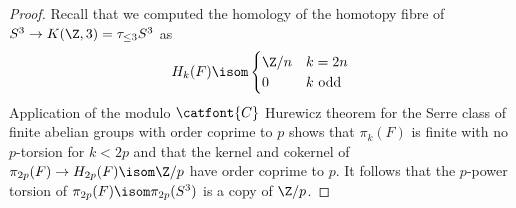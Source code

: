 \begin{proof}
	Recall that we computed the homology of the homotopy fibre of $S^3 \to K(\Z, 3) = \tau_{\leq 3} S^3$ as
	\begin{equation*}
		H_k(F) \isom \begin{cases}
			\Z / n 	& k = 2n \\
			0 		& k \text{ odd}
		\end{cases}
	\end{equation*}
	Application of the modulo $\catfont{C}$ Hurewicz theorem for the Serre class of finite abelian groups with order coprime to $p$ shows that $\pi_k(F)$ is finite with no $p$-torsion for $k < 2p$ and that the kernel and cokernel of $\pi_{2p}(F) \to H_{2p}(F) \isom \Zn{p}$ have order coprime to $p$.
	It follows that the $p$-power torsion of $\pi_{2p}(F) \isom \pi_{2p}(S^3)$ is a copy of $\Zn{p}$.
\end{proof}

